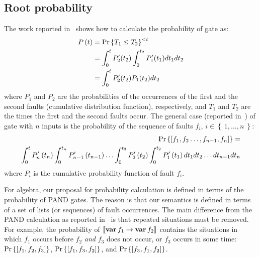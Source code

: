 \subsection{Root probability}

The work reported in~\cite{Merle2010} shows how to calculate the probability of  gate as:
%
\begin{align}
P\left(t\right) & = \Pr\left\{T_1 \le T_2 \right\}^{<t}\nonumber\\
& = \int_0^t P'_2(t_2) \int_0^{t_2} P'_1(t_1) dt_1 dt_2 \nonumber\\
& = \int_0^t P'_2(t_2) P_1(t_2) dt_2\label{eq:pand-probability}
\end{align}
%
where $P_1$ and $P_2$ are the probabilities of the occurrences of the first and the second faults (cumulative distribution function), respectively, and $T_1$ and $T_2$ are the times the first and the second faults occur.
The general case (reported in~\cite{FAR1976}) of  gate with $n$ inputs is the probability of the sequence of faults $f_i$, $i \in \left\{~1, \ldots, n~\right\}$:
%
\begin{align}
\Pr\left\{\left[f_1,f_2\ldots,f_{n-1},f_n\right]\right\} = \nonumber\\ \int_0^tP'_{n}\left(t_{n}\right)\int_0^{t_n}P'_{n-1}\left(t_{n-1}\right)\ldots\int_0^{t_3}P'_{2}\left(t_{2}\right)
 \int_0^{t_2}P'_{1}\left(t_{1}\right) dt_1 dt_2\ldots dt_{n-1}  dt_n\label{eq:general-pand-probability}
\end{align}
%
where $P_i$ is the cumulative probability function of fault $f_i$.

For \ac{algebra}, our proposal for probability calculation is defined in terms of the probability of \ac{PAND} gates.
The reason is that our semantics is defined in terms of a set of lists (or sequences) of fault occurrences.
The main difference from the \ac{PAND} calculation as reported in~\cite{FAR1976} is that repeated situations must be removed.
For example, the probability of $\left[\!\left[\operatorname{\mathbf{var}} f_1 \rightarrow \operatorname{\mathbf{var}} f_2\right]\!\right]$ contains the situations in which $f_1$ occurs before $f_2$ \emph{and} $f_3$ does not occur, or $f_3$ occurs in some time: $\Pr\left\{\left[f_1,f_2,f_3\right]\right\}$, $\Pr\left\{\left[f_1,f_3,f_2\right]\right\}$, and $\Pr\left\{\left[f_3,f_1,f_2\right]\right\}$.
%
%
%

